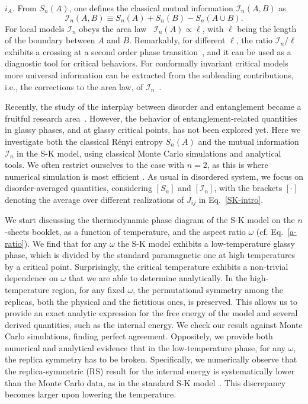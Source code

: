 \documentclass[twocolumn,superscriptaddress,prb,10pt]{revtex4-1}
\begin{document}
$i_A$. From $S_n(A)$, one defines the classical mutual information ${\mathcal I}_n(A,B)$ 
as 
%
\begin{equation}
{\mathcal I}_n(A,B)\equiv S_n(A)+S_n(B)-S_n(A\cup B). 
\end{equation}
%
For local models ${\mathcal I}_n$ obeys the area law~\cite{wolf-2008} ${\mathcal I}_n(A)
\propto\ell$, with $\ell$ being the length of the boundary between $A$ and $B$. Remarkably, 
for different $\ell$, the ratio ${\mathcal I}_n/\ell$ exhibits a crossing at a second 
order phase transition~\cite{jaconis-2013}, and it can be used as a diagnostic tool for 
critical behaviors. For conformally invariant critical models more universal information 
can be extracted from the subleading contributions, i.e., the corrections to the area 
law, of ${\mathcal I}_n$~\cite{stephan-2014}. 


Recently, the study of the interplay between disorder and entanglement became a fruitful 
research area~\cite{refael-2009}. However, the behavior of entanglement-related quantities 
in glassy phases, and at glassy critical points, has not been explored yet. Here we investigate 
both the classical R\'enyi entropy $S_n(A)$ and the mutual information ${\mathcal I}_n$ 
in the S-K model, using classical Monte Carlo simulations and analytical tools. We often 
restrict ourselves to the case with $n=2$, as this is where numerical simulation is most
efficient . As usual in disordered system, we 
focus on disorder-averaged quantities, considering $[S_n]$ and $[{\mathcal I}_n]$, 
with the brackets $[\cdot]$ denoting the average over different realizations of 
$J_{ij}$ in Eq.~\eqref{SK-intro}.

We start discussing the thermodynamic phase diagram of the S-K model on the $n$-sheets 
booklet, as a function of temperature, and the aspect ratio $\omega$ (cf. Eq.~\eqref{a-ratio}). 
We find that for any $\omega$ the S-K model exhibits a low-temperature glassy phase, which 
is divided by the standard paramagnetic one at high temperatures by a critical point. 
Surprisingly, the critical temperature exhibits a non-trivial dependence on $\omega$ 
that we are able to determine analytically. 
In the high-temperature region, for any fixed $\omega$, the permutational symmetry 
among the replicas, both the physical and the fictitious ones, is preserved. This 
allows us to provide an exact analytic expression for the free energy of the model 
and several derived quantities, such as the internal energy. We check our result 
against Monte Carlo simulations, finding perfect agreement. Oppositely, we provide 
both numerical and analytical evidence that in the low-temperature phase, for any 
$\omega$, the replica symmetry has to be broken. Specifically, we numerically observe 
that the replica-symmetric (RS) result for the internal energy  is systematically 
lower than the Monte Carlo data, as in the standard S-K model~\cite{sherrington-1978-prl,
sherrington-1978}. This discrepancy becomes larger upon lowering the temperature.  
\end{document}
